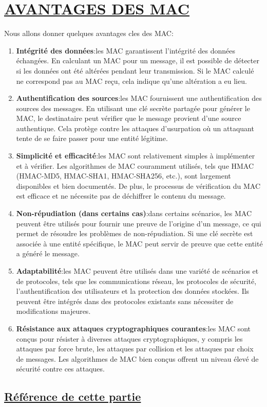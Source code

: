 \section{\textbf{\underline{AVANTAGES DES MAC}}}

Nous allons donner quelques avantages cles des MAC:

\begin{enumerate}
    \item \textbf{Intégrité des données}:les MAC garantissent l'intégrité des données échangées. En calculant un MAC pour un message, il est possible de détecter si les données ont été altérées pendant leur transmission. Si le MAC calculé ne correspond pas au MAC reçu, cela indique qu'une altération a eu lieu.
    \item \textbf{Authentification des sources}:les MAC fournissent une authentification des sources des messages. En utilisant une clé secrète partagée pour générer le MAC, le destinataire peut vérifier que le message provient d'une source authentique. Cela protège contre les attaques d'usurpation où un attaquant tente de se faire passer pour une entité légitime.
    \item \textbf{Simplicité et efficacité}:les MAC sont relativement simples à implémenter et à vérifier. Les algorithmes de MAC couramment utilisés, tels que HMAC (HMAC-MD5, HMAC-SHA1, HMAC-SHA256, etc.), sont largement disponibles et bien documentés. De plus, le processus de vérification du MAC est efficace et ne nécessite pas de déchiffrer le contenu du message.
    \item \textbf{Non-répudiation (dans certains cas)}:dans certains scénarios, les MAC peuvent être utilisés pour fournir une preuve de l'origine d'un message, ce qui permet de résoudre les problèmes de non-répudiation. Si une clé secrète est associée à une entité spécifique, le MAC peut servir de preuve que cette entité a généré le message.
    \item \textbf{Adaptabilité}:les MAC peuvent être utilisés dans une variété de scénarios et de protocoles, tels que les communications réseau, les protocoles de sécurité, l'authentification des utilisateurs et la protection des données stockées. Ils peuvent être intégrés dans des protocoles existants sans nécessiter de modifications majeures.
    \item \textbf{Résistance aux attaques cryptographiques courantes}:les MAC sont conçus pour résister à diverses attaques cryptographiques, y compris les attaques par force brute, les attaques par collision et les attaques par choix de messages. Les algorithmes de MAC bien conçus offrent un niveau élevé de sécurité contre ces attaques.\\
\end{enumerate}

\subsection{\textbf{\underline{Référence de cette partie}}}
\begin{center}
    \cite{Fortinet}\\
    \cite{bellare1996keying}\\
    \cite{klima2018cryptology}\\
    \cite{paar2009understanding}\\
    \cite{stallings2017principles}\\
    \cite{schneier1995applied}\\
\end{center}